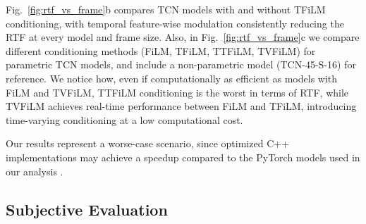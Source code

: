 Fig.~\ref{fig:rtf_vs_frame}b compares TCN models with and without TFiLM conditioning, with temporal feature-wise modulation consistently reducing the RTF at every model and frame size.
Also, in Fig.~\ref{fig:rtf_vs_frame}c we compare different conditioning methods (FiLM, TFiLM, TTFiLM, TVFiLM) for parametric TCN models, and include a non-parametric model (TCN-45-S-16) for reference.
We notice how, even if computationally as efficient as models with FiLM and TVFiLM, TTFiLM conditioning is the worst in terms of RTF, while TVFiLM achieves real-time performance between FiLM and TFiLM, introducing time-varying conditioning at a low computational cost. 

Our results represent a worse-case scenario, since optimized C++ implementations may achieve a speedup compared to the PyTorch models used in our analysis \citep{wright2019real}.

\subsection{Subjective Evaluation}
\label{sec:subj_eval}

